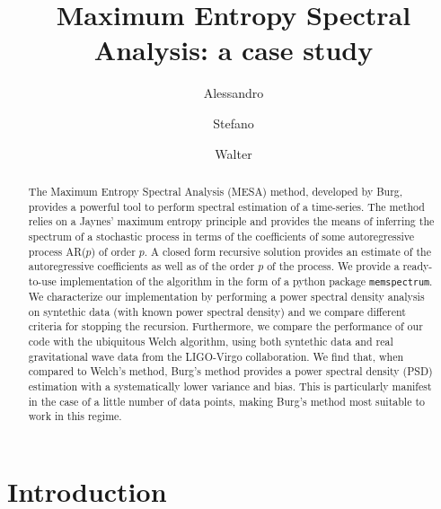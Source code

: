 \documentclass[twocolumn,showpacs,preprintnumbers,nofootinbib,prd,
superscriptaddress,10pt]{revtex4-1}
\begin{document}
\begin{abstract}
The Maximum Entropy Spectral Analysis (MESA) method, developed by Burg, provides a powerful tool to perform spectral estimation of a time-series. The method relies on a Jaynes' maximum entropy principle and provides the means of inferring the spectrum of a stochastic process in terms of the coefficients of some autoregressive process AR($p$) of order $p$.
A closed form recursive solution provides an estimate of the autoregressive coefficients as well as of the order $p$ of the process.
We provide a ready-to-use implementation of the algorithm in the form of a python package \texttt{memspectrum}. We characterize our implementation by performing a power spectral density analysis on syntethic data (with known power spectral density) and we compare different criteria for stopping the recursion. Furthermore, we compare the performance of our code with the ubiquitous Welch algorithm, using both syntethic data and real gravitational wave data from the LIGO-Virgo collaboration.
We find that, when compared to Welch's method, Burg's method provides a power spectral density (PSD) estimation with a 
systematically lower variance and bias. This is particularly manifest in the case of a little number of data points, making Burg's method most suitable to work in this regime.

\end{abstract}
	
	\title{Maximum Entropy Spectral Analysis: a case study}
	\author{Alessandro }
	\author{Stefano }
	\author{Walter }
  
	
	\maketitle
	\tableofcontents


\section{Introduction}
\end{document}
